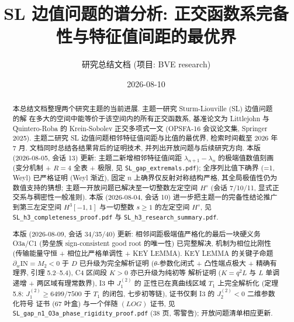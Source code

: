 \documentclass[UTF8]{ctexart}
\title{SL 边值问题的谱分析: 正交函数系完备性与特征值间距的最优界}
\author{研究总结文档 (项目: BVE research)}
\date{2026-08-10}
\begin{document}
\maketitle

\begin{abstract}
本总结文档整理两个研究主题的当前进展. 主题一研究 Sturm-Liouville (SL) 边值问题的解
在多大的空间中能等价于该空间内的所有正交函数系, 基准论文为 Littlejohn 与
Quintero-Roba 的 Krein-Sobolev 正交多项式一文 (OPSFA-16 会议论文集, Springer 2025).
主题二研究 SL 边值问题相邻特征值间距与比值的最优界, 检索时间截至 2026 年 7 月.
文档同时总结各结果背后的证明技术, 并列出开放问题与后续研究方向. 本版 (2026-08-05, 会话 13) 更新: 主题二新增相邻特征值间距 $\lambda_{n+1}-\lambda_n$ 的极端值数值刻画 (变分机制 + $R=4$ 全表 + 极限, 见 \texttt{SL\_gap\_extremals.pdf}); 全序列比值下确界 (=1, Weyl) 已严格证明 (Weyl 渐近), 固定 $n$ 上确界仅反射对称结构严格, 其全局极值性仍为数值支持的猜想; 主题一开放问题已解决至一切整数左定空间 $H^s$ (会话 7/10/11, 显式正交系与稠密性一般准则).
本版 (2026-08-04, 会话 10) 进一步把主题一的完备性结论推广到第三左定空间
$H^3[-1,1]$ 与一切整数 $s \geq 1$ 的左定空间 $H^s$, 见
\texttt{SL\_h3\_completeness\_proof.pdf} 与 \texttt{SL\_h3\_research\_summary.pdf}.

本版 (2026-08-09, 会话 34/35/40) 更新: 相邻间距极端值严格化的最后一块硬义务 O3a/C1
(势垒族 sign-consistent good root 的唯一性) 已完整解决, 机制为相位比刚性
(传输能量守恒 + 相位比严格单调性 + KEY LEMMA). KEY LEMMA 的关键子命题
$\partial_w\mathrm{IN}=M_2<0$ 于 $D$ 已升级为完全解析证明 ($\theta$-参数化闭式 +
凸性端点极大 + 精确有理界, 引理 5.2--5.4), C4 区间段 $K>0$ 亦已升级为纯初等
解析证明 ($K=q^2L$ 与 $L$ 单调递增 + 两区域有理常数界), I3 中 $J_1^{(2)}$ 的
正性已在真曲线区域 $T_1$ 上完全解析化 (定理 5.8: $J_1^{(2)}\ge6499/7500$
于 $T_1$ 的闭包, 七步初等链), 证书仅剩 I3 的 $J_2^{(2)}<0$ 二维参数化符号
证书 (67 叶盒) 与一个伴随 $(LOG)$ 证书, 见 \texttt{SL\_gap\_n1\_O3a\_phase\_rigidity\_proof.pdf}
(38 页, 零警告); 开放问题清单相应更新.


\end{abstract}
\end{document}

